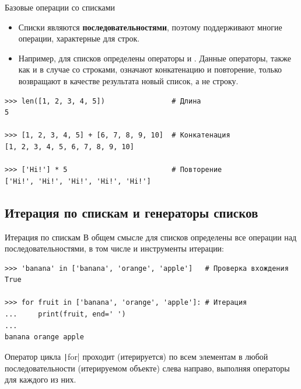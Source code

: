 \documentclass[aspectratio=169, mathserif]{beamer}%
\begin{document}
\begin{frame}[fragile]{Базовые операции со списками}
\scriptsize
\begin{itemize}
\item Списки являются \textcolor{extraorange}{\textbf{последовательностями}}, поэтому поддерживают многие операции, характерные для строк. 

\item Например, для списков определены операторы \pythoninline{+} и \pythoninline{*}. Данные операторы, также как и в случае со строками, означают конкатенацию и повторение, только возвращают в качестве результата новый список, а не строку.
\end{itemize}

\begin{verbatim}
>>> len([1, 2, 3, 4, 5])                # Длина
5

>>> [1, 2, 3, 4, 5] + [6, 7, 8, 9, 10]  # Конкатенация
[1, 2, 3, 4, 5, 6, 7, 8, 9, 10]

>>> ['Hi!'] * 5                         # Повторение
['Hi!', 'Hi!', 'Hi!', 'Hi!', 'Hi!']
\end{verbatim}
\vfill
\end{frame}


\subsection{Итерация по спискам и генераторы списков}

\begin{frame}[fragile]{Итерация по спискам}
\scriptsize
В общем смысле для списков определены все операции над последовательностями, в том числе и инструменты итерации:

\begin{verbatim}
>>> 'banana' in ['banana', 'orange', 'apple']   # Проверка вхождения
True

>>> for fruit in ['banana', 'orange', 'apple']: # Итерация
...     print(fruit, end=' ')
...
banana orange apple
\end{verbatim}

Оператор цикла \texttt|for| проходит (итерируется) по всем элементам в любой последовательности (итерируемом объекте) слева направо, выполняя операторы для каждого из них.
\vfill
\end{frame}
\end{document}
